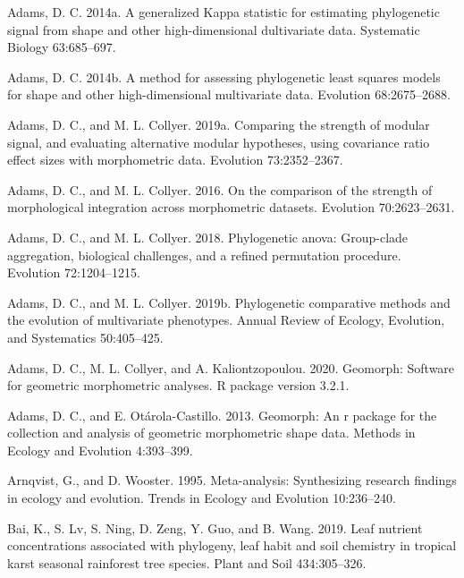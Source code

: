 \documentclass[
]{article}
\begin{document}
\leavevmode\hypertarget{ref-Adams2014a}{}%
Adams, D. C. 2014a. A generalized Kappa statistic for estimating
phylogenetic signal from shape and other high-dimensional dultivariate
data. Systematic Biology 63:685--697.

\leavevmode\hypertarget{ref-Adams2014b}{}%
Adams, D. C. 2014b. A method for assessing phylogenetic least squares
models for shape and other high-dimensional multivariate data. Evolution
68:2675--2688.

\leavevmode\hypertarget{ref-AdamsCollyer2019b}{}%
Adams, D. C., and M. L. Collyer. 2019a. Comparing the strength of
modular signal, and evaluating alternative modular hypotheses, using
covariance ratio effect sizes with morphometric data. Evolution
73:2352--2367.

\leavevmode\hypertarget{ref-AdamsCollyer2016}{}%
Adams, D. C., and M. L. Collyer. 2016. On the comparison of the strength
of morphological integration across morphometric datasets. Evolution
70:2623--2631.

\leavevmode\hypertarget{ref-AdamsCollyer2018b}{}%
Adams, D. C., and M. L. Collyer. 2018. Phylogenetic anova: Group-clade
aggregation, biological challenges, and a refined permutation procedure.
Evolution 72:1204--1215.

\leavevmode\hypertarget{ref-AdamsCollyer2019}{}%
Adams, D. C., and M. L. Collyer. 2019b. Phylogenetic comparative methods
and the evolution of multivariate phenotypes. Annual Review of Ecology,
Evolution, and Systematics 50:405--425.

\leavevmode\hypertarget{ref-AdamsGeomorph}{}%
Adams, D. C., M. L. Collyer, and A. Kaliontzopoulou. 2020. Geomorph:
Software for geometric morphometric analyses. R package version 3.2.1.

\leavevmode\hypertarget{ref-AdamsOtarola2013}{}%
Adams, D. C., and E. Otárola-Castillo. 2013. Geomorph: An r package for
the collection and analysis of geometric morphometric shape data.
Methods in Ecology and Evolution 4:393--399.

\leavevmode\hypertarget{ref-Arnqvist1995}{}%
Arnqvist, G., and D. Wooster. 1995. Meta-analysis: Synthesizing research
findings in ecology and evolution. Trends in Ecology and Evolution
10:236--240.

\leavevmode\hypertarget{ref-Bai2019}{}%
Bai, K., S. Lv, S. Ning, D. Zeng, Y. Guo, and B. Wang. 2019. Leaf
nutrient concentrations associated with phylogeny, leaf habit and soil
chemistry in tropical karst seasonal rainforest tree species. Plant and
Soil 434:305--326.
\end{document}
